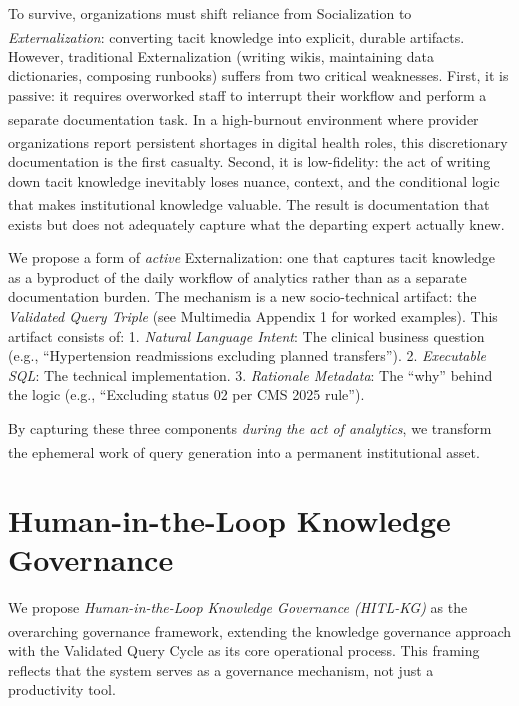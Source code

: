 \documentclass[
  american,
  11pt,
  letterpaper,
  oneside  ,captions=tableheading
]{scrartcl}
\begin{document}
To survive, organizations must shift reliance from Socialization to
\emph{Externalization}: converting tacit knowledge into explicit,
durable artifacts\textsuperscript{}.
However, traditional Externalization (writing wikis, maintaining data
dictionaries, composing runbooks) suffers from two critical weaknesses.
First, it is passive: it requires overworked staff to interrupt their
workflow and perform a separate documentation
task\textsuperscript{}. In a high-burnout
environment where provider organizations report persistent shortages in
digital health
roles\textsuperscript{}, this
discretionary documentation is the first casualty. Second, it is
low-fidelity: the act of writing down tacit knowledge inevitably loses
nuance, context, and the conditional logic that makes institutional
knowledge valuable\textsuperscript{}. The
result is documentation that exists but does not adequately capture what
the departing expert actually knew.

We propose a form of \emph{active} Externalization: one that captures
tacit knowledge as a byproduct of the daily workflow of analytics rather
than as a separate documentation burden. The mechanism is a new
socio-technical artifact: the \emph{Validated Query Triple} (see
Multimedia Appendix 1 for worked examples). This artifact consists of:
1. \emph{Natural Language Intent}: The clinical business question (e.g.,
``Hypertension readmissions excluding planned transfers''). 2.
\emph{Executable SQL}: The technical implementation. 3. \emph{Rationale
Metadata}: The ``why'' behind the logic (e.g., ``Excluding status 02 per
CMS 2025 rule'').

By capturing these three components \emph{during the act of analytics},
we transform the ephemeral work of query generation into a permanent
institutional asset\textsuperscript{}.

\section{Human-in-the-Loop Knowledge
Governance}\label{human-in-the-loop-knowledge-governance}

We propose \emph{Human-in-the-Loop Knowledge Governance (HITL-KG)} as
the overarching governance framework, extending the knowledge governance
approach\textsuperscript{} with the Validated
Query Cycle as its core operational process. This framing reflects that
the system serves as a governance mechanism, not just a productivity
tool.
\end{document}

